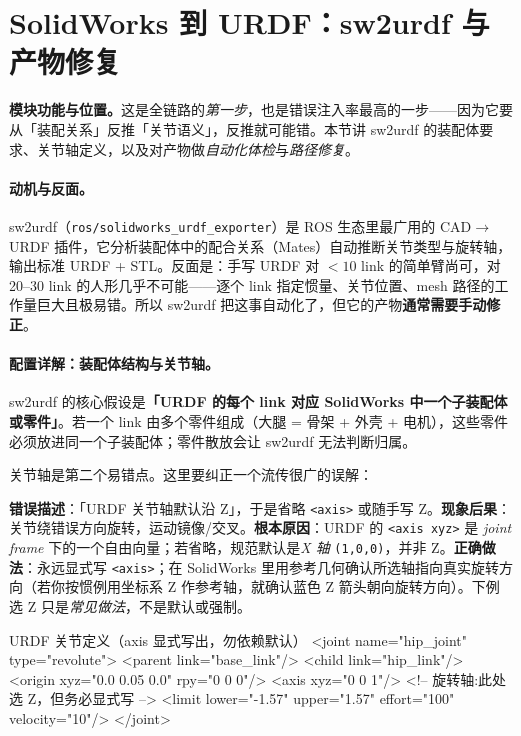 \section{SolidWorks 到 URDF：sw2urdf 与产物修复}
\label{sec:rlmc-assets-sw2urdf}

\textbf{模块功能与位置。}这是全链路的\emph{第一步}，也是错误注入率最高的一步——因为它要从「装配关系」反推「关节语义」，反推就可能错。本节讲 sw2urdf 的装配体要求、关节轴定义，以及对产物做\emph{自动化体检}与\emph{路径修复}。

\paragraph{动机与反面。}sw2urdf（\texttt{ros/\allowbreak solidworks\_urdf\_exporter}）是 ROS 生态里最广用的 CAD$\to$URDF 插件，它分析装配体中的配合关系（Mates）自动推断关节类型与旋转轴，输出标准 URDF + STL。反面是：手写 URDF 对 $<10$ link 的简单臂尚可，对 20--30 link 的人形几乎不可能——逐个 link 指定惯量、关节位置、mesh 路径的工作量巨大且极易错。所以 sw2urdf 把这事自动化了，但它的产物\textbf{通常需要手动修正}。

\paragraph{配置详解：装配体结构与关节轴。}sw2urdf 的核心假设是\textbf{「URDF 的每个 link 对应 SolidWorks 中一个子装配体或零件」}。若一个 link 由多个零件组成（大腿 = 骨架 + 外壳 + 电机），这些零件必须放进同一个子装配体；零件散放会让 sw2urdf 无法判断归属。

关节轴是第二个易错点。这里要纠正一个流传很广的误解：

\begin{pitfall}
\textbf{错误描述}：「URDF 关节轴默认沿 Z」，于是省略 \texttt{<axis>} 或随手写 Z。\textbf{现象后果}：关节绕错误方向旋转，运动镜像/交叉。\textbf{根本原因}：URDF 的 \texttt{<axis xyz>} 是 \emph{joint frame} 下的一个自由向量；若省略，规范默认是\emph{X 轴} \texttt{(1,0,0)}，并非 Z。\textbf{正确做法}：永远显式写 \texttt{<axis>}；在 SolidWorks 里用参考几何确认所选轴指向真实旋转方向（若你按惯例用坐标系 Z 作参考轴，就确认蓝色 Z 箭头朝向旋转方向）。下例选 Z 只是\emph{常见做法}，不是默认或强制。
\end{pitfall}

\begin{codebox}[text]{URDF 关节定义（axis 显式写出，勿依赖默认）}
<joint name="hip_joint" type="revolute">
  <parent link="base_link"/>
  <child  link="hip_link"/>
  <origin xyz="0.0 0.05 0.0" rpy="0 0 0"/>
  <axis   xyz="0 0 1"/>   <!-- 旋转轴:此处选 Z，但务必显式写 -->
  <limit lower="-1.57" upper="1.57" effort="100" velocity="10"/>
</joint>
\end{codebox}

